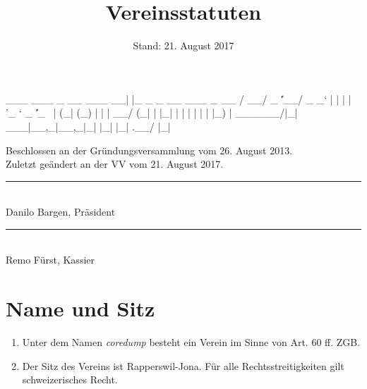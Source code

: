 \documentclass[10pt,a4paper,parskip,fleqn]{scrartcl}
\title{\Huge Vereinsstatuten}
\date{Stand: 21. August 2017}
\newcommand{\ol}{\begin{enumerate}[itemsep=-0.2em,topsep=-0.2em]}
\newcommand{\lo}{\end{enumerate}}
\newcommand{\li}{\item}
\begin{document}
\begin{verbbox}
  ___ ___  _ __ ___  __| |_   _ _ __ ___  _ __  
 / __/ _ \| '__/ _ \/ _` | | | | '_ ` _ \| '_ \ 
| (_| (_) | | |  __/ (_| | |_| | | | | | | |_) |
 \___\___/|_|  \___|\__,_|\__,_|_| |_| |_| .__/ 
                                         |_|    
\end{verbbox}

\begin{titlepage}

	\maketitle
	\thispagestyle{empty} %

  \begin{center}

		\vspace{1cm}

		\theverbbox

		\vfill

		\large Beschlossen an der Gründungsversammlung vom 26. August 2013.\\
		\vspace{1em}
		\large Zuletzt geändert an der VV vom 21. August 2017.

		\vspace{1.5cm}

		\begin{minipage}[t]{0.49\textwidth}
			\center
			\rule{5cm}{0.2mm}\\
			Danilo Bargen, Präsident
		\end{minipage}
		\begin{minipage}[t]{0.49\textwidth}
			\center
			\rule{5cm}{0.2mm}\\
			Remo Fürst, Kassier
		\end{minipage}

  \end{center}

\end{titlepage}


\section{Name und Sitz}

\ol
	\li Unter dem Namen \textit{coredump} besteht ein Verein im Sinne von Art. 60
	ff. ZGB.
	\li Der Sitz des Vereins ist Rapperswil-Jona. Für alle Rechtsstreitigkeiten
	gilt schweizerisches Recht.
\lo
\end{document}
